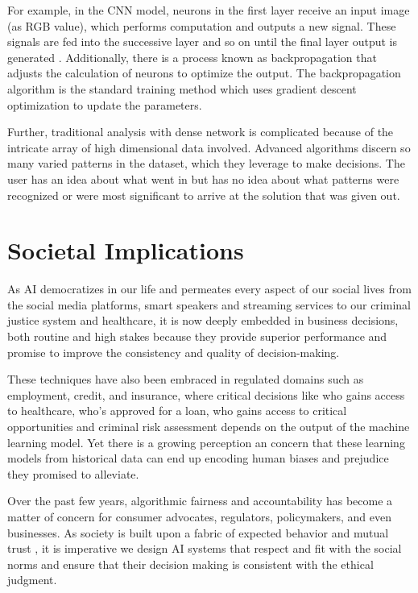 For example, in the CNN model, neurons in the first layer receive an input image (as RGB value), which performs computation and outputs a new signal. These signals are fed into the successive layer and so on until the final layer output is generated \cite{darksecretaimittr}. Additionally, there is a process known as backpropagation that adjusts the calculation of neurons to optimize the output. The backpropagation algorithm is the standard training method which uses gradient descent optimization to update the parameters.

Further, traditional analysis with dense network is complicated because of the intricate array of high dimensional data involved. Advanced algorithms discern so many varied patterns in the dataset, which they leverage to make decisions. The user has an idea about what went in but has no idea about what patterns were recognized or were most significant to arrive at the solution that was given out.

\section{Societal Implications}

As AI democratizes in our life and permeates every aspect of our social lives from the social media platforms, smart speakers and streaming services to our criminal justice system and healthcare, it is now deeply embedded in business decisions, both routine and high stakes because they provide superior performance and promise to improve the consistency and quality of decision-making. 

These techniques have also been embraced in regulated domains such as employment, credit, and insurance, where critical decisions like who gains access to healthcare, who’s approved for a loan, who gains access to critical opportunities and criminal risk assessment \cite{ainow2018} depends on the output of the machine learning model. Yet there is a growing perception an concern that these learning models from historical data can end up encoding human biases and prejudice they promised to alleviate.

Over the past few years, algorithmic fairness and accountability has become a matter of concern for consumer advocates, regulators, policymakers, and even businesses. As society is built upon a fabric of expected behavior and mutual trust \cite{Lipton2018}, it is imperative we design AI systems that respect and fit with the social norms and ensure that their decision making is consistent with the ethical judgment.

